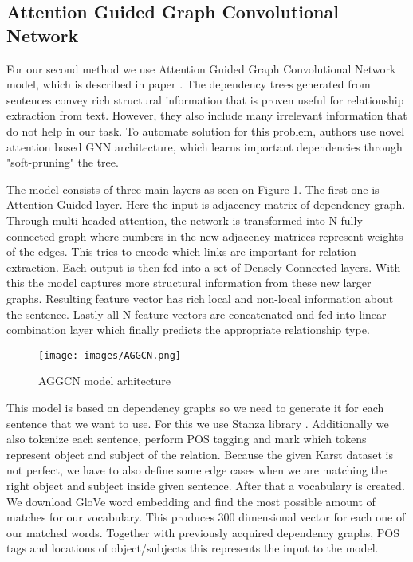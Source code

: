 \documentclass[fleqn,moreauthors,10pt]{ds_report}
\begin{document}


\subsection{Attention Guided Graph Convolutional Network}
\par For our second method we use Attention Guided Graph Convolutional Network model, which is described in paper \cite{zhijiang_nodate}. The dependency trees generated from sentences convey rich structural information that is proven useful for relationship extraction from text. However, they also include many irrelevant information that do not help in our task. To automate solution for this problem, authors use novel attention based GNN architecture, which learns important dependencies through "soft-pruning" the tree. 
\par The model consists of three main layers as seen on Figure \ref{fig:aggcn}. The first one is Attention Guided layer. Here the input is adjacency matrix of dependency graph. Through multi headed attention, the network is transformed into N fully connected graph where numbers in the new adjacency matrices represent weights of the edges. This tries to encode which links are important for relation extraction. Each output is then fed into a set of Densely Connected layers. With this the model captures more structural information from these new larger graphs. Resulting feature vector has rich local and non-local information about the sentence. Lastly all N feature vectors are concatenated and fed into linear combination layer which finally predicts the appropriate relationship type.

\begin{figure}[h]
    \centering
    \texttt{[image: images/AGGCN.png]}
    \caption{AGGCN model arhitecture \textsuperscript{\cite{zhijiang_nodate}}}
    \label{fig:aggcn}
\end{figure}

\par This model is based on dependency graphs so we need to generate it for each sentence that we want to use. For this we use Stanza library \textsuperscript{\cite{qi2020stanza}}. Additionally we also tokenize each sentence, perform POS tagging and mark which tokens represent object and subject of the relation. Because the given Karst dataset is not perfect, we have to also define some edge cases when we are matching the right object and subject inside given sentence. After that a vocabulary is created. We download GloVe word embedding\textsuperscript{\cite{pennington2014glove}} and find the most possible amount of matches for our vocabulary. This produces 300 dimensional vector for each one of our matched words. Together with previously acquired dependency graphs, POS tags and locations of object/subjects this represents the input to the model. 
\end{document}
